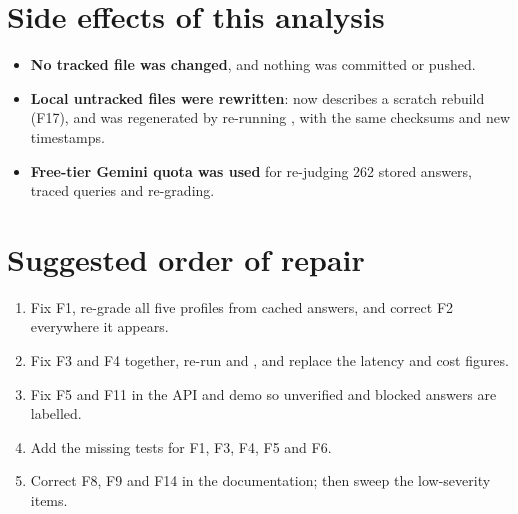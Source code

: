 \section{Side effects of this analysis}

\begin{itemize}
  \item \textbf{No tracked file was changed}, and nothing was committed or pushed.
  \item \textbf{Local untracked files were rewritten}:  now describes a scratch rebuild (F17), and  was regenerated by re-running , with the same checksums and new timestamps.
  \item \textbf{Free-tier Gemini quota was used} for re-judging 262 stored answers, traced queries and re-grading.
\end{itemize}

\section{Suggested order of repair}

\begin{recommended}
\begin{enumerate}
  \item Fix F1, re-grade all five profiles from cached answers, and correct F2 everywhere it appears.
  \item Fix F3 and F4 together, re-run  and , and replace the latency and cost figures.
  \item Fix F5 and F11 in the API and demo so unverified and blocked answers are labelled.
  \item Add the missing tests for F1, F3, F4, F5 and F6.
  \item Correct F8, F9 and F14 in the documentation; then sweep the low-severity items.
\end{enumerate}
\end{recommended}
